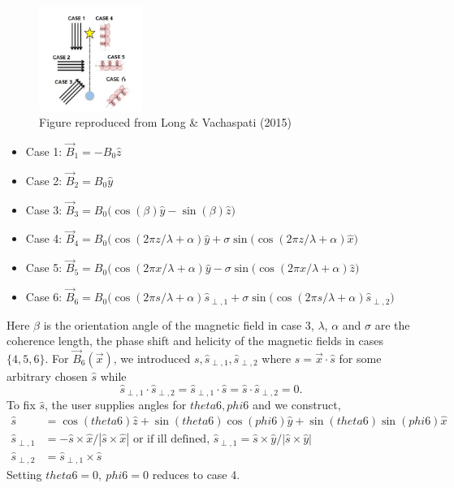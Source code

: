 \documentclass[article, superscriptaddress, ctexart, nofootinbib]{revtex4}
\def\be{\begin{equation}}
\def\ee{\end{equation}}
\begin{document}
\begin{figure}[tbhp]
	\centering
	\includegraphics[width=0.3\textwidth]{Bcases.png}
	\caption{Figure reproduced from Long \& Vachaspati (2015)}
\end{figure}
\begin{itemize}
 \item{Case 1: $\vec{B}_1=- B_0 \hat{z}$}
 \item{Case 2: $\vec{B}_2= B_0 \hat{y}$}
 \item{Case 3: $\vec{B}_3= B_0 \big(\cos(\beta)\hat{y}-\sin(\beta)\hat{z}\big)$}
 \item{Case 4: $\vec{B}_4= B_0\big( \cos(2\pi z/\lambda+\alpha)\hat{y}+\sigma \sin(\cos(2\pi z/\lambda+\alpha)\hat{x}\big)$}
 \item{Case 5: $\vec{B}_5= B_0\big( \cos(2\pi x/\lambda+\alpha)\hat{y}-\sigma \sin(\cos(2\pi x/\lambda+\alpha)\hat{z}\big)$}
 \item{Case 6: $\vec{B}_6= B_0\big( \cos(2\pi s/\lambda+\alpha)\hat{s}_{\perp,1}+\sigma \sin(\cos(2\pi s/\lambda+\alpha)\hat{s}_{\perp,2}\big)$}
\end{itemize}
Here $\beta$ is the orientation angle of the magnetic field in case 3, $\lambda$, $\alpha$ and $\sigma$ are the coherence length, the phase shift and helicity of the magnetic fields
in cases $\{4,5,6\}$. For $\vec{B}_6(\vec{x})$, we introduced $s,\hat{s}_{\perp,1}, \hat{s}_{\perp,2}$ where $s=\vec{x}\cdot\hat{s}$ for some arbitrary chosen $\hat{s}$ while 
\be
\hat{s}_{\perp,1}\cdot \hat{s}_{\perp,2}=\hat{s}_{\perp,1}\cdot \hat{s}=\hat{s}\cdot \hat{s}_{\perp,2}=0.
\ee
To fix $\hat{s}$, the user supplies angles for $theta6,phi6$ and we construct,
\begin{align}
\hat{s}&=\cos(theta6)\hat{z}+\sin(theta6)\cos(phi6)\hat{y}+\sin(theta6)\sin(phi6)\hat{x}\\
\hat{s}_{\perp,1}&=-\hat{s}\times \hat{x}/|\hat{s}\times \hat{x}|\text{  or if ill defined, }\hat{s}_{\perp,1}=\hat{s}\times \hat{y}/|\hat{s}\times \hat{y}|\\
\hat{s}_{\perp,2}&=\hat{s}_{\perp,1}\times \hat{s} 
\end{align}
Setting $theta6=0,~phi6=0$ reduces to case 4.
\end{document}
